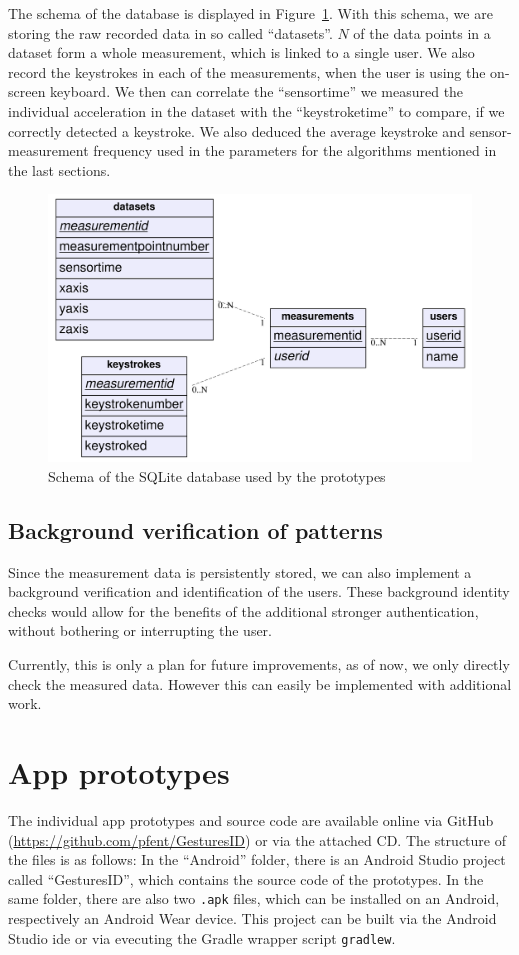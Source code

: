 The schema of the database is displayed in Figure~\ref{fig:dbschema}. With this schema, we are  storing the raw recorded data in so called ``datasets''. $N$ of the data points in a dataset form a whole measurement, which is linked to a single user. We also record the keystrokes in each of the measurements, when the user is using the on-screen keyboard. We then can correlate the ``sensortime'' we measured the individual acceleration in the dataset with the ``keystroketime'' to compare, if we correctly detected a keystroke. We also deduced the average keystroke and sensor-measurement frequency used in the parameters for the algorithms mentioned in the last sections.
\begin{figure}
    \centering
    \includegraphics[width=\textwidth]{figures/databaseschema.png}
    \caption{Schema of the SQLite database used by the prototypes}
    \label{fig:dbschema}
\end{figure}

\subsection{Background verification of patterns}
Since the measurement data is persistently stored, we can also implement a background verification and identification of the users. These background identity checks would allow for the benefits of the additional stronger authentication, without bothering or interrupting the user.

Currently, this is only a plan for future improvements, as of now, we only directly check the measured data. However this can easily be implemented with additional work.
\section{App prototypes}
The individual app prototypes and source code are available online via GitHub (\url{https://github.com/pfent/GesturesID}) or via the attached CD. The structure of the files is as follows: In the ``Android'' folder, there is an Android Studio project called ``GesturesID'', which contains the source code of the prototypes. In the same folder, there are also two \lstinline$.apk$ files, which can be installed on an Android, respectively an Android Wear device. This project can be built via the Android Studio \gls{ide} or via evecuting the Gradle wrapper script \lstinline$gradlew$.

